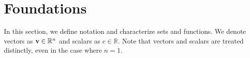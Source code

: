 \part{Foundations}

In this section, we define notation and characterize sets and functions. We denote vectors as $\mathbf{v} \in \mathbb{R}^n$ and scalars as $c \in \mathbb{R}$. Note that vectors and scalars are treated distinctly, even in the case where $n=1$.

\newpage




